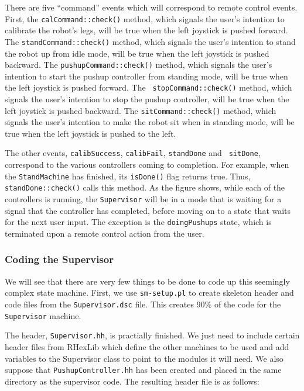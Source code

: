There are five ``command'' events which will correspond to remote control
events. First, the {\tt calCommand::check()} method, which signals the user's intention
to calibrate the robot's legs, will be true when the left joystick is pushed
forward. The {\tt standCommand::check()} method, which signals the user's
intention to stand the robot up from idle mode, will be true when the left
joystick is pushed backward. The {\tt pushupCommand::check()} method, which
signals the user's intention to start the pushup controller from standing mode,
will be true when the left joystick is pushed forward. The {\tt
stopCommand::check()} method, which signals the user's intention to stop the
pushup controller, will be true when the left joystick is pushed backward. The
{\tt sitCommand::check()} method, which signals the user's intention to make the
robot sit when in standing mode, will be true when the left joystick is pushed
to the left.

The other events, {\tt calibSuccess}, {\tt calibFail}, {\tt standDone} and {\tt
sitDone}, correspond to the various controllers coming to completion. For
example, when the {\tt StandMachine} has finished, its {\tt isDone()} flag
returns true. Thus, {\tt standDone::check()} calls this method. As the figure
shows, while each of the controllers is running, the {\tt Supervisor} will be in
a mode that is waiting for a signal that the controller has completed, before
moving on to a state that waits for the next user input. The exception is the
{\tt doingPushups} state, which is terminated upon a remote control action from
the user.

\subsubsection{Coding the Supervisor}

We will see that there are very few things to be done to code up this seemingly
complex state machine. First, we use {\tt sm-setup.pl} to create skeleton header
and code files from the {\tt Supervisor.dsc} file. This creates 90\% of the code
for the {\tt Supervisor} machine.

The header, {\tt Supervisor.hh}, is practially finished. We just need to include
certain header files from RHexLib which define the other machines to be used and
add variables to the Supervisor class to point to the modules it will need. We
also suppose that {\tt PushupController.hh} has been created and placed in the
same directory as the supervisor code. The resulting header file is as follows:

